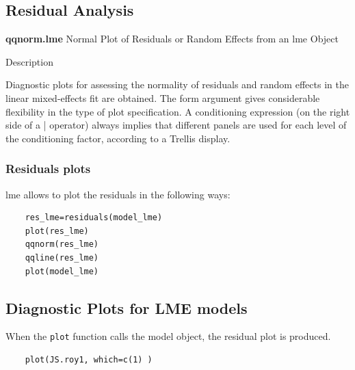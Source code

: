 \documentclass[Main.tex]{subfiles}
\begin{document}
\subsection{Residual Analysis}


\textbf{qqnorm.lme}
Normal Plot of Residuals or Random Effects from an lme Object

Description

Diagnostic plots for assessing the normality of residuals and random effects in the linear mixed-effects fit are obtained. 
The form argument gives considerable flexibility in the type of plot specification. 
A conditioning expression (on the right side of a | operator) always implies that different panels are used 
for each level of the conditioning factor, according to a Trellis display.


\subsubsection{Residuals plots}

lme allows to plot the residuals in the following ways:

\begin{framed}
	\begin{verbatim}
	res_lme=residuals(model_lme)
	plot(res_lme)
	qqnorm(res_lme)
	qqline(res_lme)
	plot(model_lme)
	\end{verbatim}
\end{framed}



\subsection{Diagnostic Plots for LME models}



When the \texttt{plot} function calls the model object, the residual plot is produced.





\begin{framed}
	\begin{verbatim}
	plot(JS.roy1, which=c(1) )
	\end{verbatim}
\end{framed}
\end{document}
